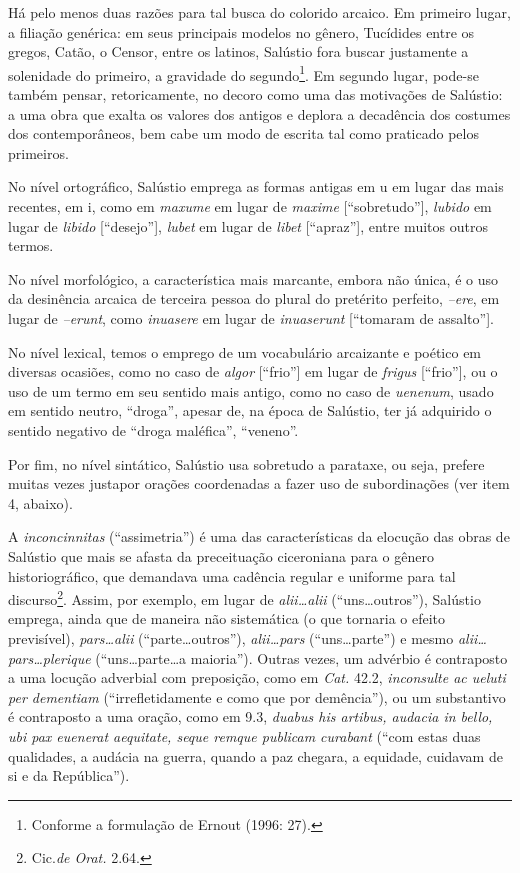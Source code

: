  Há pelo menos duas razões para tal busca do colorido arcaico. Em primeiro lugar, a filiação genérica: em seus principais modelos no gênero, Tucídides entre os gregos, Catão, o Censor, entre os latinos, Salústio fora buscar justamente a solenidade do primeiro, a gravidade do segundo\footnote{Conforme a formulação de Ernout (1996: 27).}. Em segundo lugar, pode-se também pensar, retoricamente, no decoro como uma das motivações de Salústio: a uma obra que exalta os valores dos antigos e deplora a decadência dos costumes dos contemporâneos, bem cabe um modo de escrita tal como praticado pelos primeiros. 

No nível ortográfico, Salústio emprega as formas antigas em u em
lugar das mais recentes, em i, como em \emph{maxume} em lugar de \emph{maxime}
[“sobretudo”], \emph{lubido} em lugar de \emph{libido} [“desejo”], \emph{lubet}
em lugar de \emph{libet} [“apraz”], entre muitos outros termos. 

No nível
morfológico, a característica  mais marcante, embora não única, é o uso da desinência arcaica de terceira pessoa do plural do
pretérito perfeito, \emph{–ere}, em lugar de \emph{–erunt}, como
\emph{inuasere} em lugar de \emph{inuaserunt} [“tomaram de assalto”].

No nível lexical, temos o
emprego de um vocabulário arcaizante e poético em diversas ocasiões, como no
caso de \emph{algor} [“frio”] em lugar de \emph{frigus} [“frio”],
ou o uso de um termo em seu sentido mais antigo, como no caso de
\emph{uenenum}, usado em sentido neutro, “droga”, apesar de, na época de
Salústio, ter já adquirido o sentido negativo de “droga maléfica”, “veneno”.


Por fim, no nível sintático, Salústio usa sobretudo a parataxe, ou seja, prefere muitas vezes justapor orações coordenadas a fazer uso de subordinações (ver item 4, abaixo).


A \emph{inconcinnitas} (“assimetria”) é uma das
características da elocução das obras de Salústio que mais se afasta da
preceituação ciceroniana para o gênero historiográfico, que demandava uma
cadência regular e uniforme para tal discurso\footnote{Cic.\emph{de Orat.} 2.64.}.  Assim, por
exemplo, em lugar de \emph{alii\dots alii} (“uns\ldots outros”), Salústio
emprega, ainda que de maneira não sistemática (o que tornaria o efeito
previsível), \emph{pars\dots alii} (“parte\dots outros”), \emph{alii\ldots{}pars}
(“uns\ldots parte”) e mesmo \emph{alii\dots pars\dots plerique}
(“uns\ldots{}parte\ldots{}a maioria”). Outras vezes, um advérbio é contraposto a uma locução adverbial com
preposição, como em \emph{Cat.} 42.2, \emph{inconsulte ac ueluti per dementiam}
(“irrefletidamente e como que por demência”), ou um substantivo é contraposto a
uma oração, como em 9.3, \emph{duabus his artibus, audacia in bello, ubi pax
euenerat aequitate, seque remque publicam curabant} (“com estas duas
qualidades, a audácia na guerra, quando a paz chegara, a equidade, cuidavam de
si e da República”).

